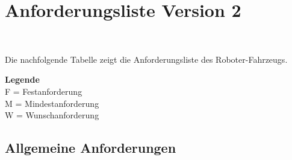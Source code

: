 \documentclass[main.tex]{subfiles} %
\begin{document}

\section{Anforderungsliste Version 2}~\label{appendix:Greifereinheit}

Die nachfolgende Tabelle zeigt die Anforderungsliste des Roboter-Fahrzeugs.

\textbf{Legende} \\ F = Festanforderung \\ M = Mindestanforderung \\ W = Wunschanforderung

\subsection{Allgemeine Anforderungen}
\end{document}
